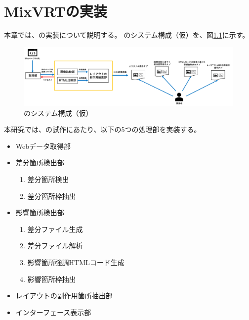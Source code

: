 \chapter{MixVRTの実装}\label{cha:Implementation}
本章では、\toolName の実装について説明する。
\toolName のシステム構成（仮）を、図\ref{fig:System}に示す。
\begin{figure}[tp]
    \begin{center}
        \includegraphics[width=1.0\columnwidth]{image/4_System.png}
        \caption{\toolName のシステム構成（仮）}
        \label{fig:System}
    \end{center}
\end{figure}
本研究では、\toolName の試作にあたり、以下の5つの処理部を実装する。
\begin{itemize}
    \item Webデータ取得部
    \item 差分箇所検出部
          \begin{enumerate}
              \item 差分箇所検出
              \item 差分箇所枠抽出
          \end{enumerate}
    \item 影響箇所検出部
          \begin{enumerate}
              \item 差分ファイル生成
              \item 差分ファイル解析
              \item 影響箇所強調HTMLコード生成
              \item 影響箇所枠抽出
          \end{enumerate}
    \item レイアウトの副作用箇所抽出部
    \item インターフェース表示部
\end{itemize}
